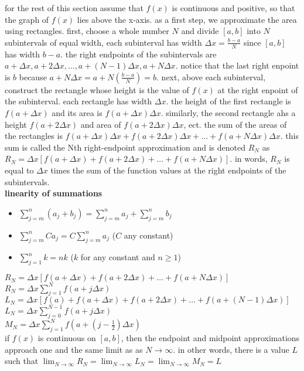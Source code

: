 \documentclass{article}
\begin{document}
for the rest of this section assume that $f(x)$ is continuous and positive, so that the graph of $f(x)$ lies above the x-axis. as a first step, we approximate the area using rectangles. first, choose a whole number $N$ and divide $[a, b]$ into $N$ subintervals of equal width, each subinterval has width $\Delta x = \frac{b - a}{N}$ since $[a, b]$ has width $b - a$. the right endpoints of the subintervals are $a + \Delta x, a + 2\Delta x, \ldots, a + (N - 1)\Delta x, a + N\Delta x$. notice that the last right enpoint is $b$ because $a + N\Delta x = a + N(\frac{b - a}{N}) = b$. next, above each subinterval, construct the rectangle whose height is the value of $f(x)$ at the right enpoint of the subinterval. each rectangle has width $\Delta x$. the height of the first rectangle is $f(a + \Delta x)$ and its area is $f(a + \Delta x)\Delta x$. similarly, the second rectangle ahs a height $f(a + 2\Delta x)$ and area of $f(a + 2\Delta x)\Delta x$, ect. the sum of the areas of the rectangles is $f(a + \Delta x)\Delta x + f(a + 2\Delta x)\Delta x + \ldots + f(a + N\Delta x)\Delta x$. this sum is called the Nth right-endpoint approximation and is denoted $R_N$ as $R_N = \Delta x[f(a + \Delta x) + f(a + 2\Delta x) + \ldots + f(a + N\Delta x)]$. in words, $R_N$ is equal to $\Delta x$ times the sum of the function values at the right endpoints of the subintervals.\\

\textbf{linearity of summations}
	\begin{itemize}
		\item $\sum_{j=m}^{n}(a_j + b_j) = \sum_{j=m}^{n}a_j + \sum_{j=m}^{n}b_j$
		\item $\sum_{j=m}^{n}Ca_j = C\sum_{j=m}^{n}a_j$ ($C$ any constant)
		\item $\sum_{j=1}^{n}k = nk$ ($k$ for any constant and $n \geq 1$)
	\end{itemize}

$R_N = \Delta x[f(a + \Delta x) + f(a + 2\Delta x) + \ldots + f(a + N\Delta x)]$\\
$R_N = \Delta x\sum_{j=1}^{N}f(a + j\Delta x)$\\
$L_N = \Delta x[f(a) + f(a + \Delta x) + f(a + 2\Delta x) + \ldots + f(a + (N -1)\Delta x)]$\\
$L_N = \Delta x\sum_{j=0}^{N-1}f(a + j\Delta x)$\\
$M_N = \Delta x\sum_{j=1}^{N}f(a + (j - \frac{1}{2})\Delta x)$\\

if $f(x)$ is continuous on $[a, b]$, then the endpoint and midpoint approximations approach one and the same limit as as $N \to \infty$. in other words, there is a value $L$ such that $\lim_{N \to \infty}R_N = \lim_{N \to \infty}L_N = \lim_{N \to \infty}M_N = L$\\
\end{document}
